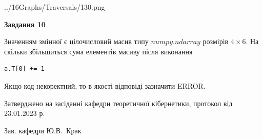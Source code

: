 \documentclass[12pt, ukrainian]{article}
\begin{document}
{\begin {large}
\begin{center}
	{../16Graphs/Traversals/130.png}
\end{center}\par
\newpage

{\begin {center}\textbf{Завдання 10}\end {center}}\par
Значенням змінної  є цілочисловий масив типу $numpy.ndarray$ розмірів $4{\times}6$. На скільки збільшиться сума елементів масиву  після виконання
\begin{verbatim}
a.T[0] += 1
\end{verbatim}


Якщо код некоректний, то в якості відповіді зазначити ERROR.\par
\newpage


\end {large}
}
{\smallskip \begin {small} Затверджено на засіданні кафедри теоретичної кібернетики, протокол  від   23.01.2023 р.\par\smallskip\smallskip
{\parbox {6.5 cm}{Зав. кафедри \dotfill Ю.В.~Крак}} \end{small}}
\end{document}
